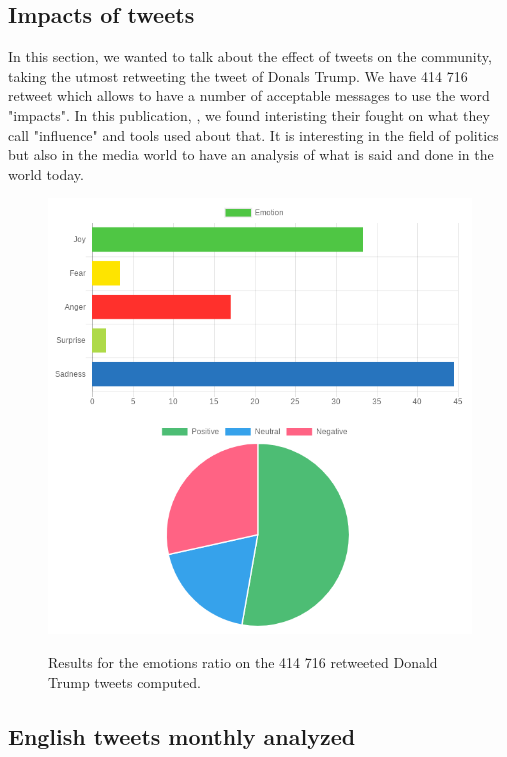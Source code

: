 \documentclass{acmtog} %
\begin{document}
\subsection{Impacts of tweets}
\label{subsub:impacts_tweets}

In this section, we wanted to talk about the effect of tweets on the community, taking the utmost retweeting the tweet of Donals Trump. We have 414 716 retweet which allows to have a number of acceptable messages to use the word "impacts". In this publication, \cite{Vyas17}, we found interisting their fought on what they call "influence" and tools used about that. It is interesting in the field of politics but also in the media world to have an analysis of what is said and done in the world today.


\begin{figure}[H]
{\includegraphics[width=\linewidth]{retweeted_emotion_sentiment_trump-exemple.png}}
\caption{Results for the emotions ratio on the 414 716 retweeted Donald Trump tweets computed.}
  \label{fig:trump_results}
\end{figure}

\subsection{English tweets monthly analyzed}
\label{subsub:english_tweets_monthly}
\end{document}
